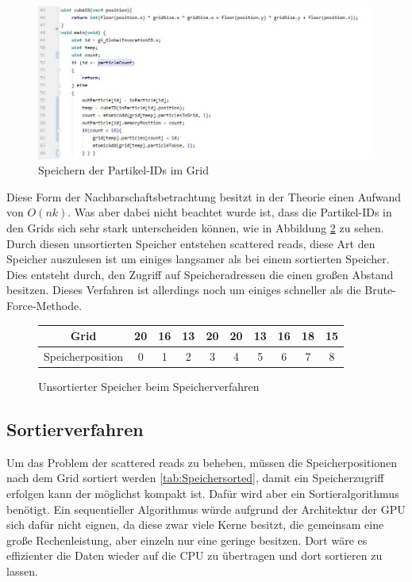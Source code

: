 \documentclass[intern,palatino]{cgBA}
\begin{document}
\begin{figure}[H]
	\centering
	\includegraphics[width=1.3\columnwidth]{Bilder/StoringLable.jpg}
	\caption{Speichern der Partikel-IDs im Grid }
	\label{img:Storinglable}
\end{figure}

Diese Form der Nachbarschaftsbetrachtung besitzt in der Theorie einen Aufwand von $O(n k)$. Was aber dabei nicht beachtet wurde ist, dass die Partikel-IDs in den Grids sich sehr stark unterscheiden können, wie in Abbildung \ref{tab:Speicher} zu sehen.
\newline
Durch diesen unsortierten Speicher entstehen scattered reads, diese Art den Speicher auszulesen ist um einiges langsamer als bei einem sortierten Speicher. Dies entsteht durch, den Zugriff auf Speicheradressen die einen großen Abstand besitzen.
\newline
Dieses Verfahren ist allerdings noch um einiges schneller als die Brute-Force-Methode.

\begin{figure}[H]
	\centering
	\begin{tabular}{ | c || c | c | c | c | c | c | c | c | c |}
		\hline
		Grid 				&  20 & 16 & 13 & 20 & 20 & 13 & 16 & 18 & 15	\\ \hline
		Speicherposition	&   0 &  1 &  2 &  3 &  4 &  5 &  6 &  7 &  8	\\
		\hline
	\end{tabular}
	\caption{Unsortierter Speicher beim Speicherverfahren}
	\label{tab:Speicher}
\end{figure}


\subsection{Sortierverfahren}\label{sortieren}
Um das Problem der scattered reads zu beheben, müssen die Speicherpositionen nach dem Grid sortiert werden \ref{tab:Speichersorted}, damit ein Speicherzugriff erfolgen kann der möglichst kompakt ist. Dafür wird aber ein Sortieralgorithmus benötigt. Ein sequentieller Algorithmus würde aufgrund der Architektur der GPU sich dafür nicht eignen, da diese zwar viele Kerne besitzt, die gemeinsam eine große Rechenleistung, aber einzeln nur eine geringe besitzen. Dort wäre es effizienter die Daten wieder auf die CPU zu übertragen und dort sortieren zu lassen.
\end{document}
